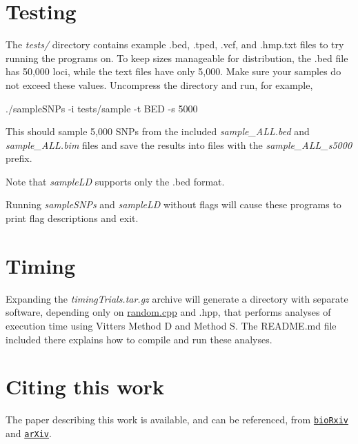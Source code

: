 \section*{Testing}

The {\itshape tests/} directory contains example .bed, .tped, .vcf, and .hmp.\+txt files to try running the programs on. To keep sizes manageable for distribution, the .bed file has 50,000 loci, while the text files have only 5,000. Make sure your samples do not exceed these values. Uncompress the directory and run, for example, \begin{DoxyVerb}./sampleSNPs -i tests/sample -t BED -s 5000
\end{DoxyVerb}


This should sample 5,000 S\+N\+Ps from the included {\itshape sample\+\_\+\+A\+L\+L.\+bed} and {\itshape sample\+\_\+\+A\+L\+L.\+bim} files and save the results into files with the {\itshape sample\+\_\+\+A\+L\+L\+\_\+s5000} prefix.

Note that {\itshape sample\+LD} supports only the .bed format.

Running {\itshape sample\+S\+N\+Ps} and {\itshape sample\+LD} without flags will cause these programs to print flag descriptions and exit.

\section*{Timing}

Expanding the {\itshape timing\+Trials.\+tar.\+gz} archive will generate a directory with separate software, depending only on \hyperlink{random_8cpp}{random.\+cpp} and .hpp, that performs analyses of execution time using Vitter\textquotesingle{}s Method D and Method S. The R\+E\+A\+D\+M\+E.\+md file included there explains how to compile and run these analyses.

\section*{Citing this work}

The paper describing this work is available, and can be referenced, from \href{https://www.biorxiv.org/content/early/2017/11/17/220871}{\tt bio\+Rxiv} and \href{https://arxiv.org/abs/1711.06325}{\tt ar\+Xiv}. 